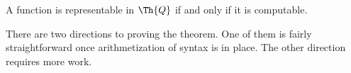 \documentclass[../../include/open-logic-section]{subfiles}
\begin{document}

\begin{thm}
A function is representable in $\Th{Q}$ if and only if it is computable.
\end{thm}

There are two directions to proving the theorem. One of them is fairly
straightforward once arithmetization of syntax is in place. The other
direction requires more work.
\end{document}
